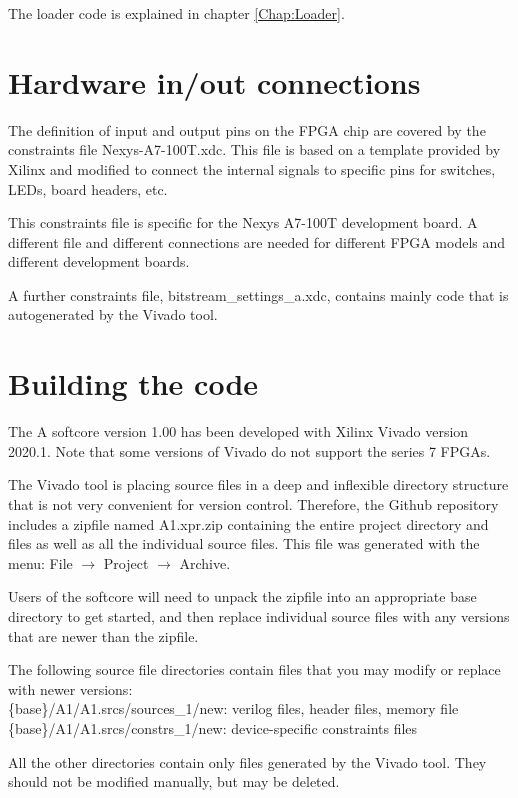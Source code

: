 \documentclass[11pt,a4paper,oneside,openright]{report}
\newcommand{\vv}{ \vspace{2mm} }   %
\begin{document}
The loader code is explained in chapter \ref{Chap:Loader}.
\vv
\vv


\section{Hardware in/out connections}
The definition of input and output pins on the FPGA chip are covered by the constraints file Nexys-A7-100T.xdc. This file is based on a template provided by Xilinx and modified to connect the internal signals to specific pins for switches, LEDs, board headers, etc.
\vv

This constraints file is specific for the Nexys A7-100T development board. A different file and different connections are needed for different FPGA models and different development boards.
\vv

A further constraints file, bitstream\_settings\_a.xdc, contains mainly code that is autogenerated by the Vivado tool.
\vv
\vv


\section{Building the code}
The A softcore version 1.00 has been developed with Xilinx Vivado version 2020.1. Note that some versions of Vivado do not support the series 7 FPGAs.
\vv

The Vivado tool is placing source files in a deep and inflexible directory structure that is not very convenient for version control. Therefore, the Github repository includes a zipfile named A1.xpr.zip containing the entire project directory and files as well as all the individual source files. This file was generated with the menu: File $\rightarrow$ Project $\rightarrow$ Archive.
\vv

Users of the softcore will need to unpack the zipfile into an appropriate base directory to get started, and then replace individual source files with any versions that are newer than the zipfile.
\vv

The following source file directories contain files that you may modify or replace with newer versions:\\
\{base\}/A1/A1.srcs/sources\_1/new: verilog files, header files, memory file \\
\{base\}/A1/A1.srcs/constrs\_1/new: device-specific constraints files \\
\vv

All the other directories contain only files generated by the Vivado tool. They should not be modified manually, but may be deleted.
\vv
\end{document}
